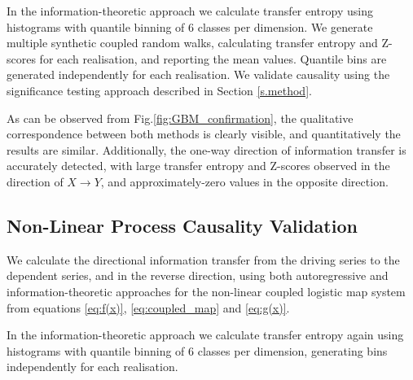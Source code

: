 \documentclass[]{rsos}%
\begin{document}
  In the information-theoretic approach we calculate transfer entropy using histograms with quantile binning of 6 classes per dimension. We generate multiple synthetic coupled random walks, calculating transfer entropy and Z-scores for each realisation, and reporting the mean values. Quantile bins are generated independently for each realisation. We validate causality using the significance testing approach described in Section \ref{s.method}.

  As can be observed from Fig.\ref{fig:GBM_confirmation}, the qualitative correspondence between both methods is clearly visible, and quantitatively the results are similar. Additionally, the one-way direction of information transfer is accurately detected, with large transfer entropy and Z-scores observed in the direction of $X \rightarrow Y$, and approximately-zero values in the opposite direction.


    

 
  \subsection{Non-Linear Process Causality Validation}

  We calculate the directional information transfer from the driving series to the dependent series, and in the reverse direction, using both autoregressive and information-theoretic approaches for the non-linear coupled logistic map system from equations \ref{eq:f(x)}, \ref{eq:coupled_map} and \ref{eq:g(x)}.  

  In the information-theoretic approach we calculate transfer entropy again using histograms with quantile binning of 6 classes per dimension, generating bins independently for each realisation.
  
\end{document}
